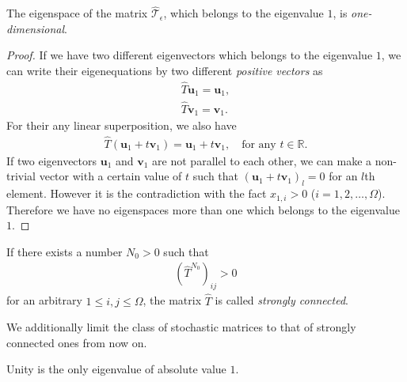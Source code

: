 \begin{lemma}
	The eigenspace of the matrix $\hat{\mathcal{T}}_{\epsilon}$, which belongs to the eigenvalue $1$, is \textit{one-dimensional}. 
\end{lemma}

\begin{proof}
	If we have two different eigenvectors which belongs to the eigenvalue $1$, we can write their eigenequations by two different \textit{positive vectors} as
	\begin{align}
	\hat{T}\bm{u}_{1} = \bm{u}_{1},\\
	\hat{T}\bm{v}_{1} = \bm{v}_{1}.
	\end{align}
	For their any linear superposition, we also have
	\begin{align}
	\hat{T}(\bm{u}_{1} + t\bm{v}_{1}) = \bm{u}_{1} + t\bm{v}_{1},\quad\text{for any $t\in\mathbb{R}$}.
	\end{align}
	If two eigenvectors $\bm{u}_{1}$ and $\bm{v}_{1}$ are not parallel to each other, we can make a non-trivial vector with a certain value of $t$ such that $\left(\bm{u}_{1} + t\bm{v}_{1}\right)_{l} = 0$ for an $l$th element. However it is the contradiction with the fact $x_{1,i}>0$ ($i=1,2,\dots,\Omega$). Therefore we have no eigenspaces more than one which belongs to the eigenvalue $1$.
\end{proof}

\begin{definition}\label{def:StrongConn}
	If there exists a number $N_{0}>0$ such that
	\begin{align}
	\left(\hat{T}^{N_{0}}\right)_{ij}>0
	\end{align}
	for an arbitrary $1\leq i,j\leq \Omega$, the matrix $\hat{T}$ is called \textit{strongly connected}.
\end{definition}

We additionally limit the class of stochastic matrices to that of strongly connected ones from now on.

\begin{theorem}
	Unity is the only eigenvalue of absolute value $1$.
\end{theorem}


